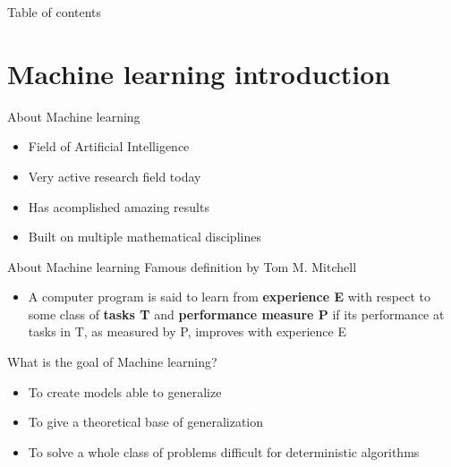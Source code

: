 \documentclass[aspectratio=169]{beamer}
\begin{document}
\begin{frame}{Table of contents}
    \tableofcontents
\end{frame}

\section{Machine learning introduction}
\begin{frame}{About Machine learning}
    \begin{itemize}
        \item Field of Artificial Intelligence
        \item Very active research field today
        \item Has acomplished amazing results
        \item Built on multiple mathematical disciplines
    \end{itemize}
\end{frame}
\begin{frame}{About Machine learning}
    Famous definition by Tom M. Mitchell
    \begin{itemize}
        \item A computer program is said to learn from \textbf{experience E}  with respect to some class of \textbf{tasks T}
            and \textbf{performance measure P} if its performance at tasks in T, as measured by P, improves with experience E
    \end{itemize}
    What is the goal of Machine learning?
    \begin{itemize}
        \item To create models able to generalize
        \item To give a theoretical base of generalization
        \item To solve a whole class of problems difficult for deterministic algorithms
    \end{itemize}
\end{frame}
\end{document}
